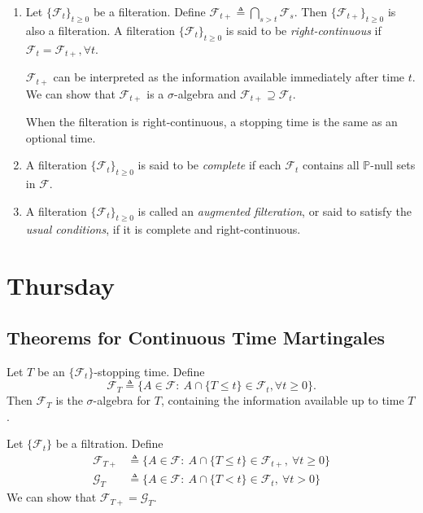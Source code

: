 \begin{definition}\label{def:5:4}
\begin{enumerate}
\item
Let $\{\mathcal{F}_t\}_{t\ge0}$ be a filteration.
Define $\mathcal{F}_{t+}\triangleq \bigcap_{s>t}\mathcal{F}_s$.
Then $\{\mathcal{F}_{t+}\}_{t\ge0}$ is also a filteration.
A filteration $\{\mathcal{F}_t\}_{t\ge0}$ is said to be \emph{right-continuous} if 
$\mathcal{F}_t = \mathcal{F}_{t+},\forall t$.

\begin{remark}
$\mathcal{F}_{t+}$ can be interpreted as the information available immediately after time $t$.
We can show that $\mathcal{F}_{t+}$ is a $\sigma$-algebra and $\mathcal{F}_{t+}\supseteq \mathcal{F}_t$.

When the filteration is right-continuous, a stopping time is the same as an optional time.
\end{remark}
\item
A filteration $\{\mathcal{F}_t\}_{t\ge0}$ is said to be \emph{complete} if each $\mathcal{F}_t$ contains all $\mathbb{P}$-null sets in $\mathcal{F}$.
\item
A filteration $\{\mathcal{F}_t\}_{t\ge0}$ is called an \emph{augmented filteration}, or said to satisfy the \emph{usual conditions}, if it is complete and right-continuous.
\end{enumerate}
\end{definition}

\section{Thursday}
\subsection{Theorems for Continuous Time Martingales}

\begin{definition}
Let $T$ be an $\{\mathcal{F}_t\}$-stopping time.
Define
\[
\mathcal{F}_T\triangleq \{
A\in\mathcal{F}:~A\cap\{T\le t\}\in\mathcal{F}_t,\forall t\ge0
\}.
\]
Then $\mathcal{F}_T$ is the $\sigma$-algebra for $T$,
containing the information available up to time $T$.
\end{definition}

\begin{proposition}
Let $\{\mathcal{F}_t\}$ be a filtration. Define
\begin{align*}
\mathcal{F}_{T+}&\triangleq \{A\in\mathcal{F}:~A\cap\{T\le t\}\in\mathcal{F}_{t+},~\forall t\ge0\}\\
\mathcal{G}_{T}&\triangleq \{A\in\mathcal{F}:~A\cap\{T< t\}\in\mathcal{F}_{t},~\forall t>0\}
\end{align*}
We can show that $\mathcal{F}_{T+} = \mathcal{G}_T$.
\end{proposition}

